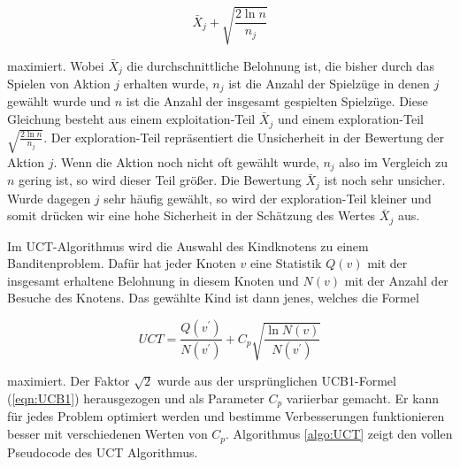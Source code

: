 \begin{equation}
\bar{X}_j + \sqrt{\frac{2\ln n}{n_j}}
\label{eqn:UCB1}
\end{equation}

maximiert. Wobei $\bar{X}_j$ die durchschnittliche Belohnung ist, die bisher durch das Spielen von Aktion $j$ erhalten wurde, $n_j$ ist die Anzahl der Spielzüge in denen $j$ gewählt wurde und $n$ ist die Anzahl der insgesamt gespielten Spielzüge. Diese Gleichung besteht aus einem exploitation-Teil $\bar{X}_j$ und einem exploration-Teil $\sqrt{\frac{2\ln n}{n_j}}$. Der exploration-Teil repräsentiert die Unsicherheit in der Bewertung der Aktion $j$. Wenn die Aktion noch nicht oft gewählt wurde, $n_j$ also im Vergleich zu $n$ gering ist, so wird dieser Teil größer. Die Bewertung $\bar{X}_j$ ist noch sehr unsicher. Wurde dagegen $j$ sehr häufig gewählt, so wird der exploration-Teil kleiner und somit drücken wir eine hohe Sicherheit in der Schätzung des Wertes $\bar{X}_j$ aus.

\bigskip
Im UCT-Algorithmus wird die Auswahl des Kindknotens zu einem Banditenproblem. Dafür hat jeder Knoten $v$ eine Statistik $Q(v)$ mit der insgesamt erhaltene Belohnung in diesem Knoten und $N(v)$ mit der Anzahl der Besuche des Knotens. Das gewählte Kind ist dann jenes, welches die Formel

\begin{equation}
UCT = \frac{Q(v^\prime)}{N(v^ \prime)} + C_p\sqrt{\frac{\ln N(v)}{N(v^\prime)}}
\label{eqn:UCT}
\end{equation}

maximiert. Der Faktor $\sqrt{2}$ wurde aus der ursprünglichen UCB1-Formel (\ref{eqn:UCB1}) herausgezogen und als Parameter $C_p$ variierbar gemacht. Er kann für jedes Problem optimiert werden und bestimme Verbesserungen funktionieren besser mit verschiedenen Werten von $C_p$. Algorithmus \ref{algo:UCT} zeigt den vollen Pseudocode des UCT Algorithmus.

